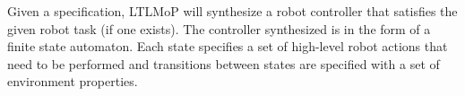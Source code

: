 \documentclass[conference]{IEEEtran}
\newcommand{\lt}{{\tt True }}
\newcommand{\lf}{{\tt False }}
\newcommand{\ltnsp}{{\tt True}}
\begin{document}
Given a specification,  LTLMoP will synthesize a robot controller that satisfies the given robot task (if one exists). The controller synthesized is in the form of a finite state automaton.
Each state specifies a set of high-level robot actions that need to be performed and transitions between states are specified with a set of environment properties.




\end{document}
